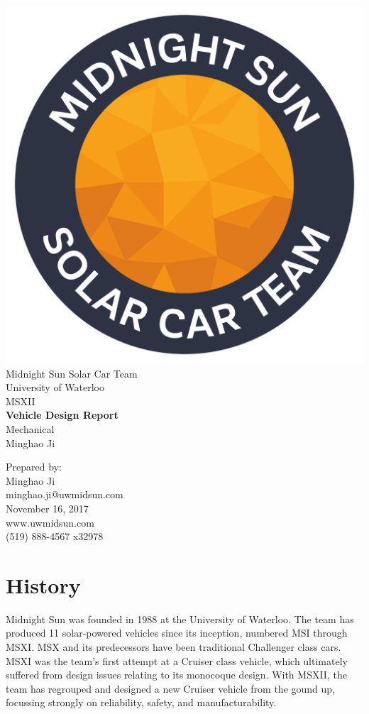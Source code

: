\documentclass[10pt]{article}
\makeatletter
\newcommand\theteamname{Midnight Sun Solar Car Team} %
\newcommand\theuniversityname{University of Waterloo} %
\newcommand\theteamwebsite{www.uwmidsun.com} %
\newcommand\theteamphone{(519) 888-4567 x32978} %
\newcommand\thetitle{Vehicle Design Report} %
\newcommand\thesubtitle{Mechanical} %
\newcommand\theauthor{Minghao Ji} %
\newcommand\theauthorcontact{minghao.ji@uwmidsun.com} %
\newcommand\thedate{November 16, 2017} %
\makeatother
\begin{document}

\begin{titlepage}
\large
\vspace*{2cm}
\centering
\includegraphics[width=.25\textwidth]{figures/RIMMED_logo_round_no_road_full_text_MIDRES.png} \\
\vspace{1.5cm}
{\LARGE \theteamname} \\
\theuniversityname \\
\vspace{2.2cm}
{\LARGE MSXII} \\
\vspace{0.4cm}
{\huge\bfseries \thetitle} \\
\vspace{0.2cm}
{\LARGE \thesubtitle} \\
\vspace{2.2cm}
\ifdefined \theauthor
\par Prepared by: \\
\theauthor \\
\theauthorcontact \\
\fi
\thedate \\
\vfill
\theteamwebsite \\
\theteamphone
\end{titlepage}

\tableofcontents
\listoffigures %
\listoftables %

\section{History}
Midnight Sun was founded in 1988 at the University of Waterloo. The team has produced 11 solar-powered vehicles since its inception, numbered MSI through MSXI. MSX and its predecessors have been traditional Challenger class cars. MSXI was the team's first attempt at a Cruiser class vehicle, which ultimately suffered from design issues relating to its monocoque design. With MSXII, the team has regrouped and designed a new Cruiser vehicle from the gound up, focussing strongly on reliability, safety, and manufacturability.
\end{document}
